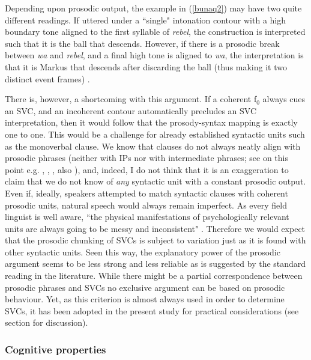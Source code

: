Depending upon prosodic output, the example in (\ref{bunaq2}) may have two quite different readings. If uttered under a ``single" intonation contour with a high boundary tone aligned to the first syllable of \textit{rebel}, the construction is interpreted such that it is the ball that descends. However, if there is a prosodic break between \textit{wa} and \textit{rebel}, and a final high tone is aligned to \textit{wa}, the interpretation is that it is Markus that descends after discarding the ball (thus making it two distinct event frames) \citep[442]{schapper2009bunaq}.

There is, however, a shortcoming with this argument. If a coherent f$_0$ always cues an SVC, and an incoherent contour automatically precludes an SVC interpretation, then it would follow that the prosody-syntax mapping is exactly one to one. This would be a challenge for already established syntactic units such as the monoverbal clause. We know that clauses do not always neatly align with prosodic phrases (neither with \textsc{IP}s nor with intermediate phrases; see on this point e.g. \citealt{chafe1994discourse}, \citealt{himmelmann2006challenges}, \citealt{ladd2008intonational}, also \citealt{engelhardt2010}), and, indeed, I do not think that it is an exaggeration to claim that we do not know of \emph{any} syntactic unit with a constant prosodic output. Even if, ideally, speakers attempted to match syntactic clauses with coherent prosodic units, natural speech would always remain imperfect. As every field linguist is well aware, ``the physical manifestations of psychologically relevant units are always going to be messy and inconsistent" \citep[58]{chafe1994discourse}. Therefore we would expect that the prosodic chunking of SVCs is subject to variation just as it is found with other syntactic units. Seen this way, the explanatory power of the prosodic argument seems to be less strong and less reliable as is suggested by the standard reading in the literature. While there might be a partial correspondence between prosodic phrases and SVCs no exclusive argument can be based on prosodic behaviour. Yet, as this criterion is almost always used in order to determine SVCs, it has been adopted in the present study for practical considerations (see section  for discussion).

\subsubsection{Cognitive properties} \label{sec:cognitive}

